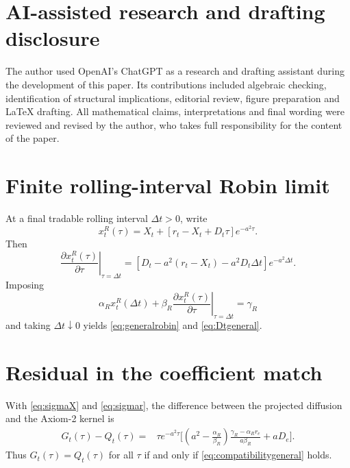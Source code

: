 \documentclass[11pt]{article}
\numberwithin{equation}{section}
\begin{document}
\section*{AI-assisted research and drafting disclosure}
The author used OpenAI's ChatGPT as a research and drafting assistant during the development of this paper. Its contributions included algebraic checking, identification of structural implications, editorial review, figure preparation and LaTeX drafting. All mathematical claims, interpretations and final wording were reviewed and revised by the author, who takes full responsibility for the content of the paper.

\begin{appendices}

\section{Finite rolling-interval Robin limit}

At a final tradable rolling interval $\Delta t>0$, write
\begin{equation}
 x_t^R(\tau)=X_t+[r_t-X_t+D_t\tau]e^{-a^2\tau}.
\end{equation}
Then
\begin{equation}
 \left.\frac{\partial x_t^R(\tau)}{\partial\tau}\right|_{\tau=\Delta t}
 =[D_t-a^2(r_t-X_t)-a^2D_t\Delta t]e^{-a^2\Delta t}.
\end{equation}
Imposing
\begin{equation}
 \alpha_Rx_t^R(\Delta t)
 +\beta_R\left.\frac{\partial x_t^R(\tau)}{\partial\tau}\right|_{\tau=\Delta t}
 =\gamma_R
\end{equation}
and taking $\Delta t\downarrow0$ yields \eqref{eq:generalrobin} and \eqref{eq:Dtgeneral}.

\section{Residual in the coefficient match}

With \eqref{eq:sigmaX} and \eqref{eq:sigmar}, the difference between the projected diffusion and the Axiom-2 kernel is
\begin{equation}
 \begin{aligned}
 G_t(\tau)-Q_t(\tau)
 ={}&\tau e^{-a^2\tau}
 \Bigg[
 \left(a^2-\frac{\alpha_R}{\beta_R}\right)
 \frac{\gamma_R-\alpha_Rr_e}{a\beta_R}
 +aD_e
 \Bigg].
 \end{aligned}
\end{equation}
Thus $G_t(\tau)=Q_t(\tau)$ for all $\tau$ if and only if \eqref{eq:compatibilitygeneral} holds.


\end{appendices}
\end{document}
